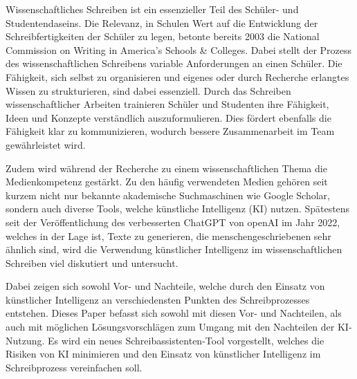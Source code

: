 \documentclass[../main.tex]{subfiles}
\begin{document}
Wissenschaftliches Schreiben ist ein essenzieller Teil des Schüler- und Studentendaseins. 
Die Relevanz, in Schulen Wert auf die Entwicklung der Schreibfertigkeiten der Schüler zu legen, betonte bereits 2003 
die National Commission on Writing in America’s Schools \& Colleges. Dabei stellt der Prozess des 
wissenschaftlichen Schreibens variable Anforderungen an einen Schüler. Die Fähigkeit, sich selbst zu organisieren und 
eigenes oder durch Recherche erlangtes Wissen zu strukturieren, sind dabei essenziell. Durch das Schreiben 
wissenschaftlicher Arbeiten trainieren Schüler und Studenten ihre Fähigkeit, Ideen und Konzepte verständlich 
auszuformulieren. Dies fördert ebenfalls die Fähigkeit klar zu kommunizieren, wodurch bessere Zusammenarbeit 
im Team gewährleistet wird.  

Zudem wird während der Recherche zu einem wissenschaftlichen Thema die Medienkompetenz gestärkt. Zu den häufig 
verwendeten Medien gehören seit kurzem nicht nur bekannte akademische Suchmaschinen wie Google Scholar, sondern auch 
diverse Tools, welche künstliche Intelligenz (KI) nutzen. Spätestens seit der Veröffentlichung des verbesserten ChatGPT von openAI im Jahr 2022, welches in der 
Lage ist, Texte zu generieren, die menschengeschriebenen sehr ähnlich sind, wird die Verwendung künstlicher Intelligenz 
im wissenschaftlichen Schreiben viel diskutiert und untersucht.\cite{humanWritingToAi}

Dabei zeigen sich sowohl Vor- und Nachteile, welche durch den Einsatz von künstlicher Intelligenz an 
verschiedensten Punkten des Schreibprozesses entstehen. 
Dieses Paper befasst sich sowohl mit diesen Vor- und Nachteilen, als auch mit möglichen
Lösungsvorschlägen zum Umgang mit den Nachteilen der KI-Nutzung. Es wird ein neues Schreibassistenten-Tool vorgestellt, welches die Risiken 
von KI minimieren und den Einsatz von künstlicher Intelligenz im Schreibprozess vereinfachen soll.
\end{document}
